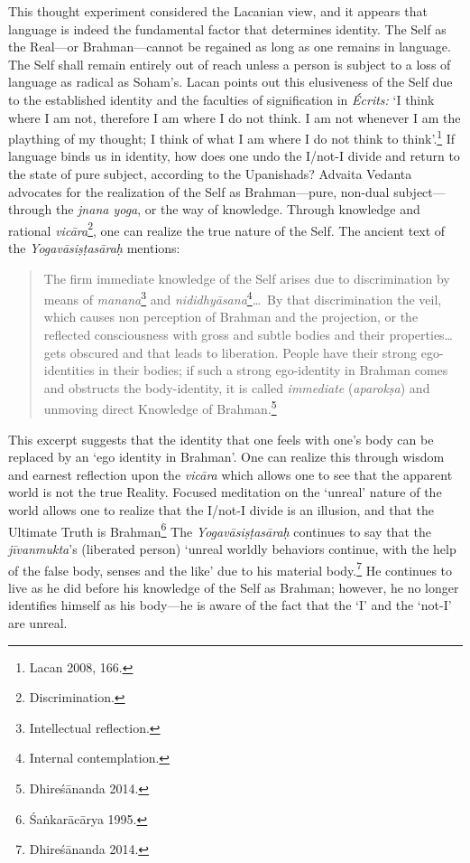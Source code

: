 This thought experiment considered the Lacanian view, and it appears
that language is indeed the fundamental factor that determines identity.
The Self as the Real---or Brahman---cannot be regained as long as one
remains in language. The Self shall remain entirely out of reach unless
a person is subject to a loss of language as radical as Soham's. Lacan
points out this elusiveness of the Self due to the established identity
and the faculties of signification in \emph{\'Ecrits:} `I think where I am
not, therefore I am where I do not think. I am not whenever I am the
plaything of my thought; I think of what I am where I do not think to
think'.\footnote{Lacan 2008, 166.} If language binds us in identity, how does one
undo the I/not-I divide and return to the state of pure subject,
according to the Upanishads? Advaita Vedanta advocates for the
realization of the Self as Brahman---pure, non-dual subject---through
the \emph{jnana yoga}, or the way of knowledge. Through knowledge and
rational \emph{vic\=ara}\footnote{Discrimination.}, one can realize the
true nature of the Self. The ancient text of the \emph{Yogav\=asi\d s\d tas\=ara\d h}
mentions:
\begin{quote}
The firm immediate knowledge of the Self arises due to discrimination
by means of \emph{manana}\footnote{Intellectual reflection.} and
\emph{nididhy\=asana}\footnote{Internal contemplation.}\ldots\ By that
discrimination the veil, which causes non perception of Brahman and the
projection, or the reflected consciousness with gross and subtle bodies
and their properties\ldots{} gets obscured and that leads to liberation.
People have their strong ego-identities in their bodies; if such a
strong ego-identity in Brahman comes and obstructs the body-identity, it
is called \emph{immediate} (\emph{aparok\d sa}) and unmoving direct
Knowledge of Brahman.\footnote{Dhire\'s\=ananda 2014.}
\end{quote}
This excerpt suggests that the identity that one feels with one's body
can be replaced by an `ego identity in Brahman'. One can realize this
through wisdom and earnest reflection upon the \emph{vic\=ara} which
allows one to see that the apparent world is not the true Reality.
Focused meditation on the `unreal' nature of the world allows one to
realize that the I/not-I divide is an illusion, and that the Ultimate
Truth is Brahman\footnote{\'Sa\.nkar\=ac\=arya 1995.} The \emph{Yogav\=asi\d s\d tas\=ara\d h}
continues to say that the \emph{jīvanmukta}'s (liberated person) `unreal
worldly behaviors continue, with the help of the false body, senses and
the like' due to his material body.\footnote{Dhire\'s\=ananda 2014.} He continues to
live as he did before his knowledge of the Self as Brahman; however, he
no longer identifies himself as his body---he is aware of the fact that
the `I' and the `not-I' are unreal.

